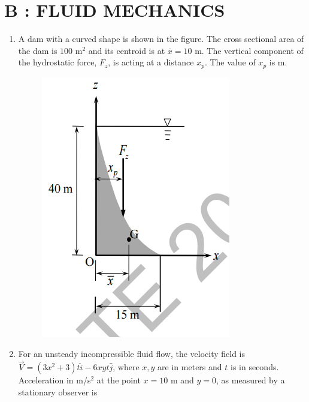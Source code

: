 \documentclass[a4paper,10pt]{article}
\begin{document}
\section*{B : FLUID MECHANICS}
\begin{enumerate}
    \item A dam with a curved shape is shown in the figure. The cross sectional area of the dam  is $100 \text{ m}^2$ and its centroid is at $\bar{x} = 10 \text{ m}$. The vertical component of the hydrostatic force, $F_z$, is acting at a distance $x_p$. The value of $x_p$ is \underline{\hspace{2cm}} m.
    \begin{figure}[H] 
        \centering 
        \includegraphics[width=0.4\columnwidth]{Bq1.png} \caption*{} 
        \label{fig:q1_fluid} 
    \end{figure}
    
    \hfill{}

    \item For an unsteady incompressible fluid flow, the velocity field is $\vec{V} = (3x^2 +3)t \hat{i} - 6xyt \hat{j}$, where $x, y$ are in meters and $t$ is in seconds. Acceleration in m/s$^2$ at the point $x=10$ m and $y=0$, as measured by a stationary observer is
    
    \hfill{}
    \begin{enumerate}[label=\Alph*)]
    \end{enumerate}


\end{enumerate}
\end{document}
